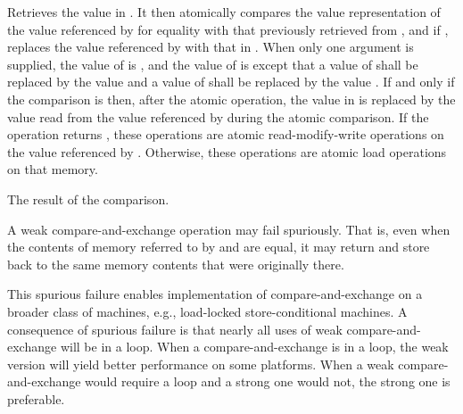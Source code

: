 \begin{itemdescr}
\begin{removedblock}
Retrieves the value in .
It then atomically compares the value representation of
the value referenced by  for equality
with that previously retrieved from ,
and if , replaces the value referenced by 
with that in .
When only one  argument is supplied,
the value of  is , and
the value of  is 
except that a value of  shall be replaced by
the value  and
a value of  shall be replaced by
the value .
If and only if the comparison is  then,
after the atomic operation,
the value in  is replaced by
the value read from the value referenced by 
during the atomic comparison.
If the operation returns ,
these operations are atomic read-modify-write operations
on the value referenced by .
Otherwise, these operations are atomic load operations on that memory.
\end{removedblock}

\begin{removedblock}
\pnum
\returns The result of the comparison.
\end{removedblock}

\pnum
\remarks A weak compare-and-exchange operation may fail spuriously.
That is, even when the contents of memory referred to
by  and  are equal,
it may return  and
store back to  the same memory contents
that were originally there.
\begin{note}
This spurious failure enables implementation of compare-and-exchange
on a broader class of machines, e.g., load-locked store-conditional machines.
A consequence of spurious failure is
that nearly all uses of weak compare-and-exchange will be in a loop.
When a compare-and-exchange is in a loop,
the weak version will yield better performance on some platforms.
When a weak compare-and-exchange would require a loop and
a strong one would not, the strong one is preferable.
\end{note}
\end{itemdescr}

~\\
~\\

 \\

